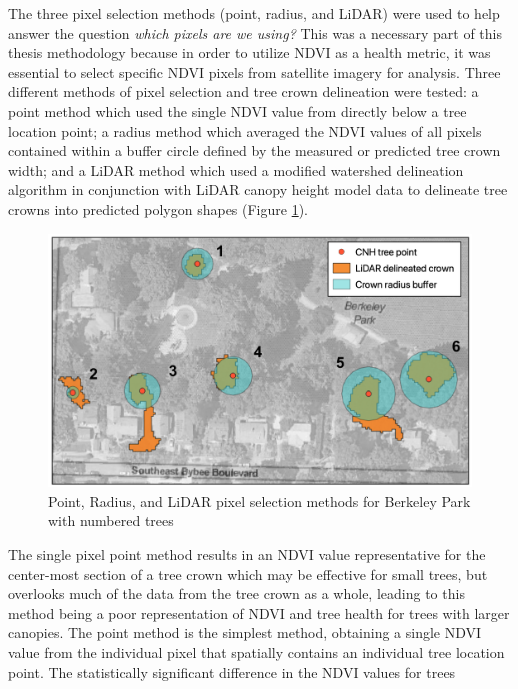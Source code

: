 \documentclass[12pt,twoside]{reedthesis}
\begin{document}
The three pixel selection methods (point, radius, and LiDAR) were used
to help answer the question \emph{which pixels are we using?} This was a
necessary part of this thesis methodology because in order to utilize
NDVI as a health metric, it was essential to select specific NDVI pixels
from satellite imagery for analysis. Three different methods of pixel
selection and tree crown delineation were tested: a point method which
used the single NDVI value from directly below a tree location point; a
radius method which averaged the NDVI values of all pixels contained
within a buffer circle defined by the measured or predicted tree crown
width; and a LiDAR method which used a modified watershed delineation
algorithm in conjunction with LiDAR canopy height model data to
delineate tree crowns into predicted polygon shapes (Figure
\ref{fig:layered-outputs-2}).
\begin{figure}[H]

{\centering \includegraphics[width=0.9\linewidth,]{figure/layered_outputs_2} 

}

\caption[Pixel selection method comparison with numbered trees]{Point, Radius, and LiDAR pixel selection methods for Berkeley Park with numbered trees}\label{fig:layered-outputs-2}
\end{figure}
The single pixel point method results in an NDVI value representative
for the center-most section of a tree crown which may be effective for
small trees, but overlooks much of the data from the tree crown as a
whole, leading to this method being a poor representation of NDVI and
tree health for trees with larger canopies. The point method is the
simplest method, obtaining a single NDVI value from the individual pixel
that spatially contains an individual tree location point. The
statistically significant difference in the NDVI values for trees
\end{document}
